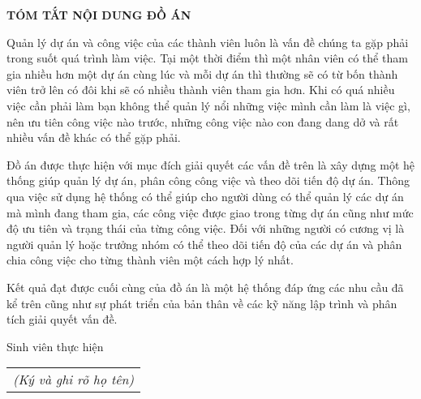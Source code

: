 \documentclass[../DoAn.tex]{subfiles}
\begin{document}
\begin{center}
    \Large{\textbf{TÓM TẮT NỘI DUNG ĐỒ ÁN}}\\
\end{center}
\vspace{1cm}

Quản lý dự án và công việc của các thành viên luôn là vấn đề chúng ta gặp phải trong suốt quá trình làm việc. Tại một thời điểm thì một nhân viên có thể tham gia nhiều hơn một dự án cùng lúc và mỗi dự án thì thường sẽ có từ bốn thành viên trở lên có đôi khi sẽ có nhiều thành viên tham gia hơn. Khi có quá nhiều việc cần phải làm bạn không thể quản lý nổi những việc mình cần làm là việc gì, nên ưu tiên công việc nào trước, những công việc nào con đang dang dở và rất nhiều vấn đề khác có thể gặp phải.

Đồ án được thực hiện với mục đích giải quyết các vấn đề trên là xây dựng một hệ thống giúp quản lý dự án, phân công công việc và theo dõi tiến độ dự án. Thông qua việc sử dụng hệ thống có thể giúp cho người dùng có thể quản lý các dự án mà mình đang tham gia, các công việc được giao trong từng dự án cũng như mức độ ưu tiên và trạng thái của từng công việc. Đối với những người có cương vị là người quản lý hoặc trưởng nhóm có thể theo dõi tiến độ của các dự án và phân chia công việc cho từng thành viên một cách hợp lý nhất.

Kết quả đạt được cuối cùng của đồ án là một hệ thống đáp ứng các nhu cầu đã kể trên cũng như sự phát triển của bản thân về các kỹ năng lập trình và phân tích giải quyết vấn đề.

\begin{flushright}
    Sinh viên thực hiện\\
    \begin{tabular}{@{}c@{}}
        \textit{(Ký và ghi rõ họ tên)}
    \end{tabular}
\end{flushright}
\end{document}
